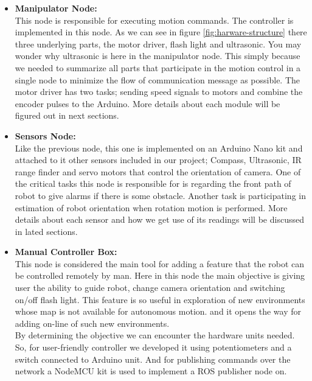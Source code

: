 \documentclass[12pt]{book}
\begin{document}
\begin{itemize}
	\item \textbf{Manipulator Node:}\\
	This node is responsible for executing motion commands. The controller is implemented in this node. As we can see in figure \ref{fig:harware-structure} there three underlying parts, the motor driver, flash light and ultrasonic. You may wonder why ultrasonic is here in the manipulator node. This simply because we needed to summarize all parts that participate in the motion control in a single node to minimize the flow of communication message as possible. The motor driver has two tasks; sending speed signals to motors and combine the encoder pulses to the Arduino. More details about each module will be figured out in next sections.
	
	\item \textbf{Sensors Node:}\\
	Like the previous node, this one is implemented on an Arduino Nano kit and attached to it other sensors included in our project; Compass, Ultrasonic, IR range finder and servo motors that control the orientation of camera. One of the critical tasks this node is responsible for is regarding the front path of robot to give alarms if there is some obstacle. Another task is participating in estimation of robot orientation when rotation motion is performed. More details about each sensor and how we get use of its readings will be discussed in lated sections. 
	
	\item \textbf{Manual Controller Box:}\\
	This node is considered the main tool for adding a feature that the robot can be controlled remotely by man. Here in this node the main objective is giving user the ability to guide robot, change camera orientation and switching on/off flash light. This feature is so useful in exploration of new environments whose map is not available for autonomous motion. and it opens the way for adding on-line of such new environments.\\
	By determining the objective we can encounter the hardware units needed. So, for user-friendly controller we developed it using potentiometers and a switch connected to Arduino unit. And for publishing commands over the network a NodeMCU kit is used to implement a ROS publisher node on. 
	

\end{itemize}
\end{document}
